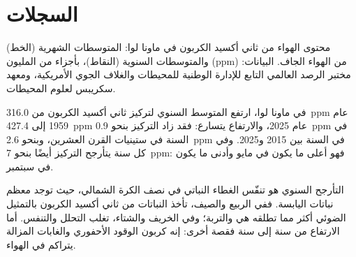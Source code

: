 \section{السجلات}

\begin{omfigure}

{\small محتوى الهواء من ثاني أكسيد الكربون في ماونا لوا: المتوسطات الشهرية
(الخط) والمتوسطات السنوية (النقاط)، بأجزاء من المليون (ppm) من الهواء الجاف.
البيانات: مختبر الرصد العالمي التابع للإدارة الوطنية للمحيطات والغلاف الجوي الأمريكية، ومعهد سكريبس لعلوم
المحيطات.}
\end{omfigure}

\begin{proposition}\label{prop:g12:climate-change:co2}
في ماونا لوا، ارتفع المتوسط السنوي لتركيز ثاني أكسيد الكربون من
\qty{316.0}{ppm} عام 1959 إلى \qty{427.4}{ppm} عام 2025، والارتفاع
يتسارع: فقد زاد التركيز بنحو \qty{0.9}{ppm} في السنة في
ستينيات القرن العشرين، وبنحو \qty{2.6}{ppm} في السنة بين 2015 و2025. وفي كل
سنة يتأرجح التركيز أيضًا بنحو \qty{7}{ppm}: فهو أعلى ما يكون في
مايو وأدنى ما يكون في سبتمبر.
\end{proposition}

\begin{remark}\label{rem:g12:climate-change:teeth}
التأرجح السنوي هو تنفّس الغطاء النباتي في نصف الكرة
الشمالي، حيث توجد معظم نباتات اليابسة. ففي الربيع والصيف، تأخذ النباتات
من ثاني أكسيد الكربون بالتمثيل الضوئي أكثر مما تطلقه هي والتربة؛
وفي الخريف والشتاء، تغلب التحلل والتنفس. أما الارتفاع من سنة إلى
سنة فقصة أخرى: إنه كربون الوقود الأحفوري والغابات
المزالة يتراكم في الهواء.
\end{remark}

